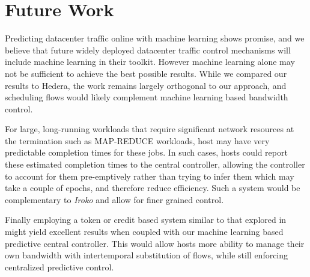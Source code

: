 \section{Future Work}
\label{sec:future}

Predicting datacenter traffic online with machine learning shows promise, and we believe that 
future widely deployed datacenter traffic control mechanisms will include
machine learning in their toolkit. However machine learning alone may not
be sufficient to achieve the best possible results. While we  
compared our results to Hedera, the work remains largely
orthogonal to our approach, and scheduling flows would likely 
complement machine learning based bandwidth control. 

For large, long-running workloads that require significant 
network resources at the termination such as MAP-REDUCE
workloads, host may have very predictable completion times
for these jobs. In such cases, hosts could report these 
estimated completion times to the central controller,
allowing the controller to account for them pre-emptively
rather than trying to infer them which may take a couple
of epochs, and therefore reduce efficiency. Such a
system would be complementary to \textit{Iroko} and
allow for finer grained control.

Finally employing a token or credit based system similar
to that explored in \cite{expresspass} might yield excellent
results when coupled with our machine learning based predictive
central controller. This would allow hosts more ability to manage
their own bandwidth with intertemporal substitution of flows,
while still enforcing centralized predictive control.

